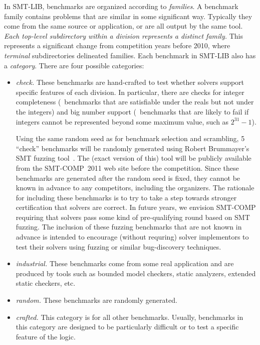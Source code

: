 \documentclass[12pt]{article}
\begin{document}
In SMT-LIB, benchmarks are organized according to \emph{families}.  A benchmark
family contains problems that are similar in some significant way.  Typically
they come from the same source or application, or are all output by the same
tool.  \emph{Each top-level subdirectory within a division represents a distinct
family.}  This represents a significant change from
competition years before 2010, where
\emph{terminal} subdirectories delineated families.
%
Each benchmark in SMT-LIB also has a \emph{category}.  There are four possible
categories:
%
\begin{itemize}
\item \emph{check.} These benchmarks are hand-crafted to test whether
  solvers support specific features of each division.  In particular,
  there are checks for integer completeness (\ie\ benchmarks that are
  satisfiable under the reals but not under the integers) and big
  number support (\ie\ benchmarks that are likely to fail if integers
  cannot be represented beyond some maximum value, such as
  $2^{31}-1$).

  \noindent%
  Using the same random seed as
  for benchmark selection and scrambling, 5 ``check'' benchmarks will
  be randomly generated using Robert Brummayer's SMT fuzzing
  tool~\cite{brummayer+09}.  The (exact version of this) tool will be
  publicly available from the SMT-COMP~2011 web site before the
  competition.  Since these benchmarks are generated after the random
  seed is fixed, they cannot be known in advance to any competitors,
  including the organizers.  The rationale for including these
  benchmarks is to try to take a step towards stronger certification
  that solvers are correct.  In future years, we envision SMT-COMP
  requiring that solvers pass some kind of pre-qualifying round based
  on SMT fuzzing.  The inclusion of these fuzzing benchmarks that are
  not known in advance is intended to encourage (without requring)
  solver implementors to test their solvers using fuzzing or similar
  bug-discovery techniques.
\item \emph{industrial.} These benchmarks come from some real application
      and are produced by tools such as bounded model checkers, static analyzers, extended
      static checkers, etc.
\item \emph{random.} These benchmarks are randomly generated.
\item \emph{crafted.} This category is for all other benchmarks.  Usually,
  benchmarks in this category are designed to be particularly difficult or to
  test a specific feature of the logic.
\end{itemize}
\end{document}
